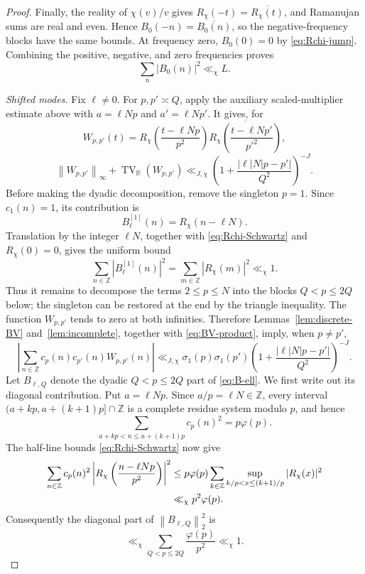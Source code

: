 \documentclass[11pt]{article}
\numberwithin{equation}{section}
\theoremstyle{definition}
\newcommand{\R}{\mathbb R}
\newcommand{\Z}{\mathbb Z}
\newcommand{\1}{\mathbf 1}
\newcommand{\TV}{\operatorname{TV}}
\newcommand{\norm}[1]{\left\lVert#1\right\rVert}
\begin{document}
\begin{proof}
Finally, the reality of \(\chi(v)/v\) gives
\(R_\chi(-t)=\overline{R_\chi(t)}\), and Ramanujan sums are real and
even.  Hence \(B_0(-n)=\overline{B_0(n)}\), so the negative-frequency
blocks have the same bounds.  At frequency zero,
\(B_0(0)=0\) by \eqref{eq:Rchi-jump}.  Combining the positive,
negative, and zero frequencies proves
\begin{equation}\label{eq:B0-total}
 \sum_n|B_0(n)|^2\ll_\chi L.
\end{equation}

\smallskip
\noindent\emph{Shifted modes.}
Fix \(\ell\ne0\).  For \(p,p'\asymp Q\), apply the auxiliary
scaled-multiplier estimate above with \(a=\ell Np\) and
\(a'=\ell Np'\).  It gives, for
\[
 W_{p,p'}(t)=
 R_\chi\left(\frac{t-\ell Np}{p^2}\right)
 \overline{R_\chi\left(\frac{t-\ell Np'}{p'^2}\right)},
\]
\begin{equation}\label{eq:BV-product}
 \norm{W_{p,p'}}_\infty+\TV_{\R}(W_{p,p'})
 \ll_{J,\chi}
 \left(1+\frac{|\ell|N|p-p'|}{Q^2}\right)^{-J}.
\end{equation}
Before making the dyadic decomposition, remove the singleton \(p=1\).
Since \(c_1(n)=1\), its contribution is
\[
 B_{\ell}^{[1]}(n)=R_\chi(n-\ell N).
\]
Translation by the integer \(\ell N\), together with
\eqref{eq:Rchi-Schwartz} and \(R_\chi(0)=0\), gives the uniform bound
\begin{equation}\label{eq:shifted-p-one}
 \sum_{n\in\Z}|B_{\ell}^{[1]}(n)|^2
 =\sum_{m\in\Z}|R_\chi(m)|^2\ll_\chi1.
\end{equation}
Thus it remains to decompose the terms \(2\le p\le N\) into the
blocks \(Q<p\le2Q\) below; the singleton can be restored at the end
by the triangle inequality.
The function \(W_{p,p'}\) tends to zero at both infinities.  Therefore
Lemmas~\ref{lem:discrete-BV} and~\ref{lem:incomplete}, together with
\eqref{eq:BV-product}, imply, when \(p\ne p'\),
\begin{equation}\label{eq:shifted-cross}
 \left|\sum_{n\in\Z}c_p(n)c_{p'}(n)W_{p,p'}(n)\right|
 \ll_{J,\chi}\sigma_1(p)\sigma_1(p')
 \left(1+\frac{|\ell|N|p-p'|}{Q^2}\right)^{-J}.
\end{equation}
Let \(B_{\ell,Q}\) denote the dyadic \(Q<p\le2Q\) part of
\eqref{eq:B-ell}.  We first write out its diagonal contribution.
Put \(a=\ell Np\).  Since \(a/p=\ell N\in\Z\), every interval
\((a+kp,a+(k+1)p]\cap\Z\) is a complete residue system modulo \(p\),
and hence
\[
 \sum_{a+kp<n\le a+(k+1)p}c_p(n)^2=p\varphi(p).
\]
The half-line bounds \eqref{eq:Rchi-Schwartz} now give
\begin{align}
 \sum_{n\in\Z}c_p(n)^2
 \left|R_\chi\left(\frac{n-\ell Np}{p^2}\right)\right|^2
 &\le p\varphi(p)\sum_{k\in\Z}
 \sup_{k/p<x\le(k+1)/p}|R_\chi(x)|^2\notag\\
 &\ll_\chi p^2\varphi(p).
 \label{eq:shifted-diagonal-periods}
\end{align}
Consequently the diagonal part of \(\norm{B_{\ell,Q}}_2^2\) is
\[
 \ll_\chi\sum_{Q<p\le2Q}\frac{\varphi(p)}{p^2}\ll_\chi1.
\]


\end{proof}
\end{document}
